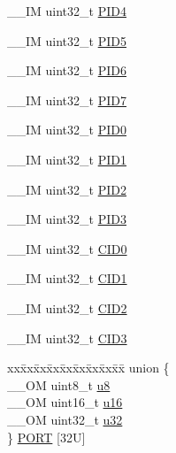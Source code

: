 \begin{DoxyCompactItemize}
\item 
\-\_\-\-\_\-\-I\-M uint32\-\_\-t \hyperlink{struct_i_t_m___type_aad5e11dd4baf6d941bd6c7450f60a158}{P\-I\-D4}
\item 
\-\_\-\-\_\-\-I\-M uint32\-\_\-t \hyperlink{struct_i_t_m___type_af9085648bf18f69b5f9d1136d45e1d37}{P\-I\-D5}
\item 
\-\_\-\-\_\-\-I\-M uint32\-\_\-t \hyperlink{struct_i_t_m___type_ad34dbe6b1072c77d36281049c8b169f6}{P\-I\-D6}
\item 
\-\_\-\-\_\-\-I\-M uint32\-\_\-t \hyperlink{struct_i_t_m___type_a2bcec6803f28f30d5baf5e20e3517d3d}{P\-I\-D7}
\item 
\-\_\-\-\_\-\-I\-M uint32\-\_\-t \hyperlink{struct_i_t_m___type_ab4a4cc97ad658e9c46cf17490daffb8a}{P\-I\-D0}
\item 
\-\_\-\-\_\-\-I\-M uint32\-\_\-t \hyperlink{struct_i_t_m___type_a89ea1d805a668d6589b22d8e678eb6a4}{P\-I\-D1}
\item 
\-\_\-\-\_\-\-I\-M uint32\-\_\-t \hyperlink{struct_i_t_m___type_a8471c4d77b7107cf580587509da69f38}{P\-I\-D2}
\item 
\-\_\-\-\_\-\-I\-M uint32\-\_\-t \hyperlink{struct_i_t_m___type_af317d5e2d946d70e6fb67c02b92cc8a3}{P\-I\-D3}
\item 
\-\_\-\-\_\-\-I\-M uint32\-\_\-t \hyperlink{struct_i_t_m___type_a30bb2b166b1723867da4a708935677ba}{C\-I\-D0}
\item 
\-\_\-\-\_\-\-I\-M uint32\-\_\-t \hyperlink{struct_i_t_m___type_ac40df2c3a6cef02f90b4e82c8204756f}{C\-I\-D1}
\item 
\-\_\-\-\_\-\-I\-M uint32\-\_\-t \hyperlink{struct_i_t_m___type_a8000b92e4e528ae7ac4cb8b8d9f6757d}{C\-I\-D2}
\item 
\-\_\-\-\_\-\-I\-M uint32\-\_\-t \hyperlink{struct_i_t_m___type_a43451f43f514108d9eaed5b017f8d921}{C\-I\-D3}
\item 
\begin{tabbing}
xx\=xx\=xx\=xx\=xx\=xx\=xx\=xx\=xx\=\kill
union \{\\
\>\_\_OM uint8\_t \hyperlink{struct_i_t_m___type_ae773bf9f9dac64e6c28b14aa39f74275}{u8}\\
\>\_\_OM uint16\_t \hyperlink{struct_i_t_m___type_a962a970dfd286cad7f8a8577e87d4ad3}{u16}\\
\>\_\_OM uint32\_t \hyperlink{struct_i_t_m___type_a5834885903a557674f078f3b71fa8bc8}{u32}\\
\} \hyperlink{struct_i_t_m___type_a2de1bb72a92abfeb659ae7d4c5f06420}{PORT} \mbox{[}32U\mbox{]}\\


\end{tabbing}
\end{DoxyCompactItemize}
